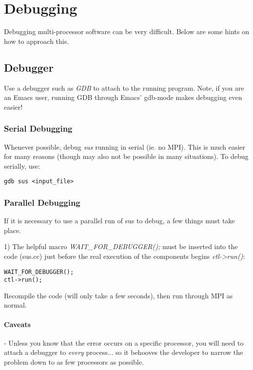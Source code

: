 \chapter{Debugging}

Debugging multi-processor software can be very difficult.  Below are
some hints on how to approach this.

\section{Debugger}

Use a debugger such as \emph{GDB} to attach to the running program.
Note, if you are an Emacs user, running GDB through Emacs' gdb-mode
makes debugging even easier!

\subsection{Serial Debugging}

Whenever possible, debug \emph{sus} running in serial (ie. no MPI).
This is much easier for many reasons (though may also not be possible
in many situations).  To debug serially, use:

\begin{Verbatim}
gdb sus <input_file>
\end{Verbatim}

\subsection{Parallel Debugging}

If it is necessary to use a parallel run of sus to debug, a few things
must take place.

1) The helpful macro \emph{WAIT_FOR_DEBUGGER();} must be inserted into
the code (sus.cc) just before the real execution of the components
begins \emph{ctl->run()}:

\begin{Verbatim}
WAIT_FOR_DEBUGGER();
ctl->run();
\end{Verbatim}

Recompile the code (will only take a few seconds), then run through
MPI as normal.  


\subsubsection{Caveats}

- Unless you know that the error occurs on a specific processor, you will need to attach a debugger to \emph{every}
process... so it behooves the developer to narrow the problem down to
as few processors as possible.

